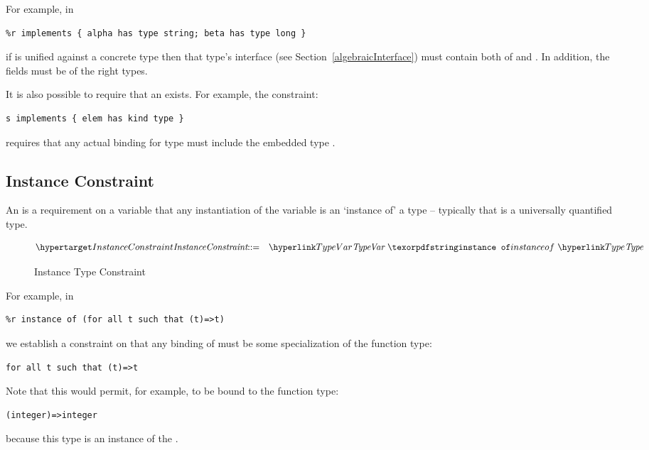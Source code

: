 For example, in
\begin{lstlisting}
%r implements { alpha has type string; beta has type long }
\end{lstlisting}
if  is unified against a concrete type then that type's  interface (see Section~\vref{algebraicInterface}) must contain both of  and . In addition, the fields must be of the right types.

\begin{aside}
It is also possible to require that an  exists. For example, the constraint:
\begin{lstlisting}
s implements { elem has kind type }
\end{lstlisting}
requires that any actual binding for type  must include the embedded type .
\end{aside}

\subsection{Instance Constraint}
\label{instanceConstraint}
An  is a requirement on a variable that any instantiation of the variable is an `instance of' a type -- typically that is a universally quantified type.

\begin{figure}[htbp]
\begin{eqnarray*}
\ntDef{InstanceConstraint}&\arrow&\ntRef{TypeVar}\ \q{instance of}\ \ntRef{Type}
\end{eqnarray*}
\caption{Instance Type Constraint}
\label{instanceConstraintFig}
\end{figure}

For example, in 
\begin{lstlisting}
%r instance of (for all t such that (t)=>t)
\end{lstlisting}
we establish a constraint on  that any binding of  must be some specialization of the function type:
\begin{lstlisting}
for all t such that (t)=>t
\end{lstlisting}
Note that this would permit, for example,  to be bound to the  function type:
\begin{lstlisting}
(integer)=>integer
\end{lstlisting}
because this type is an instance of the .

